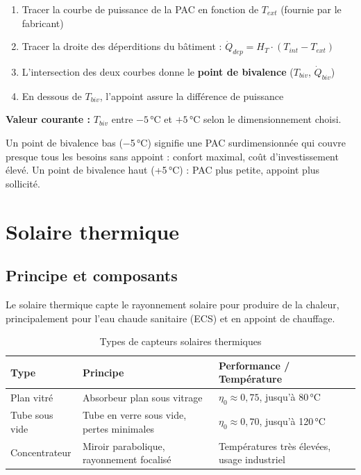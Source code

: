 \begin{methode}[title=Détermination du point de bivalence]
\begin{enumerate}
  \item Tracer la courbe de puissance de la PAC en fonction de $T_{ext}$ (fournie par le fabricant)
  \item Tracer la droite des déperditions du bâtiment : $\dot{Q}_{dep} = H_T \cdot (T_{int} - T_{ext})$
  \item L'intersection des deux courbes donne le \textbf{point de bivalence} ($T_{biv}$, $\dot{Q}_{biv}$)
  \item En dessous de $T_{biv}$, l'appoint assure la différence de puissance
\end{enumerate}
\textbf{Valeur courante :} $T_{biv}$ entre $-5$\,°C et $+5$\,°C selon le dimensionnement choisi.

Un point de bivalence bas (−5\,°C) signifie une PAC surdimensionnée qui couvre presque tous les besoins sans appoint : confort maximal, coût d'investissement élevé.
Un point de bivalence haut (+5\,°C) : PAC plus petite, appoint plus sollicité.
\end{methode}

\section{Solaire thermique}

\subsection{Principe et composants}

Le solaire thermique capte le rayonnement solaire pour produire de la chaleur, principalement pour l'eau chaude sanitaire (ECS) et en appoint de chauffage.

\begin{table}[H]
  \centering
  \caption{Types de capteurs solaires thermiques}
  \begin{tabular}{p{3cm}p{4cm}p{4.5cm}}
    \toprule
    Type & Principe & Performance / Température \\
    \midrule
    Plan vitré & Absorbeur plan sous vitrage & $\eta_0 \approx 0{,}75$, jusqu'à 80\,°C \\
    Tube sous vide & Tube en verre sous vide, pertes minimales & $\eta_0 \approx 0{,}70$, jusqu'à 120\,°C \\
    Concentrateur & Miroir parabolique, rayonnement focalisé & Températures très élevées, usage industriel \\
    \bottomrule
  \end{tabular}
\end{table}

